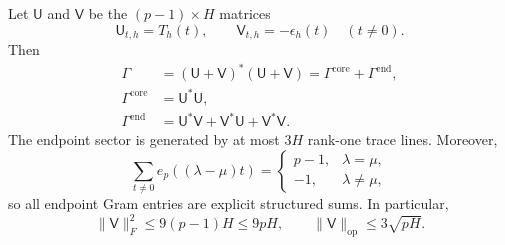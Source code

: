 Let $\mathsf U$ and $\mathsf V$ be the $(p-1)\times H$ matrices
\[
 \mathsf U_{t,h}=T_h(t),\qquad
 \mathsf V_{t,h}=-\epsilon_h(t)
 \quad(t\ne0).
\]
Then
\begin{align}
 \Gamma
 &=(\mathsf U+\mathsf V)^*(\mathsf U+\mathsf V)
 =\Gamma^{\mathrm{core}}+\Gamma^{\mathrm{end}},
 \label{gram-core-end-split}\\
 \Gamma^{\mathrm{core}}
 &=\mathsf U^*\mathsf U,
 \label{gram-core-def}\\
 \Gamma^{\mathrm{end}}
 &=\mathsf U^*\mathsf V+\mathsf V^*\mathsf U
   +\mathsf V^*\mathsf V.
 \label{gram-end-def}
\end{align}
The endpoint sector is generated by at most $3H$ rank-one trace lines.
Moreover,
\begin{equation}
 \sum_{t\ne0}e_p((\lambda-\mu)t)
 =\begin{cases}
 p-1,&\lambda=\mu,\\
 -1,&\lambda\ne\mu,
 \end{cases}
 \label{gram-endpoint-inner-product}
\end{equation}
so all endpoint Gram entries are explicit structured sums.  In
particular,
\begin{equation}
 \|\mathsf V\|_F^2\le9(p-1)H\le9pH,
 \qquad
 \|\mathsf V\|_{\mathrm{op}}\le3\sqrt{pH}.
 \label{gram-endpoint-norm}
\end{equation}

